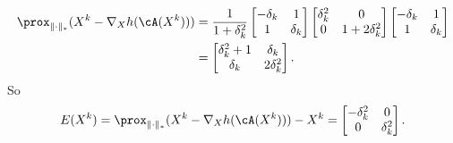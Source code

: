 \begin{equation}
\begin{split}
    \prox_{\|\cdot\|_*}(X^k-\nabla_X h(\cA(X^k)))
    &= \frac{1}{1+\delta_k^2}
    \begin{bmatrix}
        -\delta_k & 1 \\
        1  & \delta_k \\
    \end{bmatrix}
    \begin{bmatrix}
        \delta_k^2 & 0 \\
        0  & 1+2\delta_k^2 \\
    \end{bmatrix}
    \begin{bmatrix}
        -\delta_k & 1 \\
        1  & \delta_k \\
    \end{bmatrix} \\
    &=\begin{bmatrix}
        \delta_k^2+1 & \delta_k \\
        \delta_k  & 2\delta_k^2 \\
    \end{bmatrix}.
\end{split}
\end{equation}
So
\begin{equation}
    E(X^k) = \prox_{\|\cdot\|_*}(X^k-\nabla_X h(\cA(X^k))) - X^k =
    \begin{bmatrix}
        -\delta_k^2 & 0 \\
        0  & \delta_k^2 \\
    \end{bmatrix}. \\
\end{equation}
